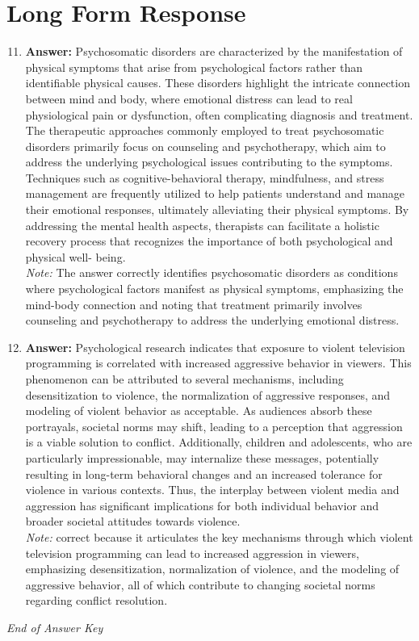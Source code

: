\documentclass[12pt]{article}
\begin{document}
\section*{Long Form Response}
\begin{enumerate}[label=\arabic*.]
\setcounter{enumi}{10}
\item \textbf{Answer:} Psychosomatic disorders are characterized by the manifestation of physical symptoms that arise from psychological factors rather than identifiable physical causes. These disorders highlight the intricate connection between mind and body, where emotional distress can lead to real physiological pain or dysfunction, often complicating diagnosis and treatment. The therapeutic approaches commonly employed to treat psychosomatic disorders primarily focus on counseling and psychotherapy, which aim to address the underlying psychological issues contributing to the symptoms. Techniques such as cognitive-behavioral therapy, mindfulness, and stress management are frequently utilized to help patients understand and manage their emotional responses, ultimately alleviating their physical symptoms. By addressing the mental health aspects, therapists can facilitate a holistic recovery process that recognizes the importance of both psychological and physical well- being.
\\ \textit{Note:} The answer correctly identifies psychosomatic disorders as conditions where psychological factors manifest as physical symptoms, emphasizing the mind-body connection and noting that treatment primarily involves counseling and psychotherapy to address the underlying emotional distress.
\item \textbf{Answer:} Psychological research indicates that exposure to violent television programming is correlated with increased aggressive behavior in viewers. This phenomenon can be attributed to several mechanisms, including desensitization to violence, the normalization of aggressive responses, and modeling of violent behavior as acceptable. As audiences absorb these portrayals, societal norms may shift, leading to a perception that aggression is a viable solution to conflict. Additionally, children and adolescents, who are particularly impressionable, may internalize these messages, potentially resulting in long-term behavioral changes and an increased tolerance for violence in various contexts. Thus, the interplay between violent media and aggression has significant implications for both individual behavior and broader societal attitudes towards violence.
\\ \textit{Note:} correct because it articulates the key mechanisms through which violent television programming can lead to increased aggression in viewers, emphasizing desensitization, normalization of violence, and the modeling of aggressive behavior, all of which contribute to changing societal norms regarding conflict resolution.
\end{enumerate}

\vfill
\noindent\textit{End of Answer Key}
\end{document}
